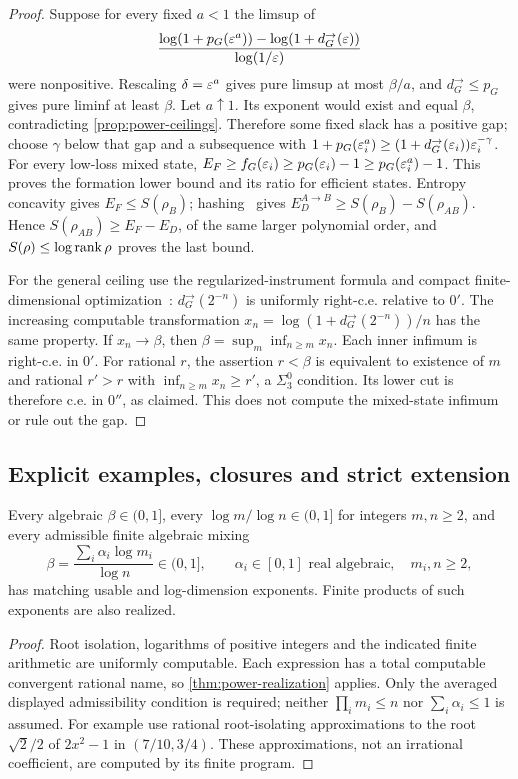 \begin{proof}
Suppose for every fixed $a<1$ the limsup of
\[
 \frac{\log(1+p_G(\varepsilon^a))-\log(1+d_G^\to(\varepsilon))}{\log(1/\varepsilon)}
\]
were nonpositive. Rescaling $\delta=\varepsilon^a$ gives pure limsup at most $\beta/a$, and $d_G^\to\le p_G$ gives pure liminf at least $\beta$. Let $a\uparrow1$. Its exponent would exist and equal $\beta$, contradicting \cref{prop:power-ceilings}. Therefore some fixed slack has a positive gap; choose $\gamma$ below that gap and a subsequence with
$1+p_G(\varepsilon_i^a)\ge(1+d_G^\to(\varepsilon_i))\varepsilon_i^{-\gamma}$.
For every low-loss mixed state, $E_F\ge f_G(\varepsilon_i)\ge p_G(\varepsilon_i)-1\ge p_G(\varepsilon_i^a)-1$. This proves the formation lower bound and its ratio for efficient states. Entropy concavity gives $E_F\le S(\rho_B)$; hashing~\cite{DW05} gives $E_D^{A\to B}\ge S(\rho_B)-S(\rho_{AB})$. Hence $S(\rho_{AB})\ge E_F-E_D$, of the same larger polynomial order, and $S(\rho)\le\log\operatorname{rank}\rho$ proves the last bound.

For the general ceiling use the regularized-instrument formula and compact finite-dimensional optimization~\cite[Theorem~11.14]{DM-precision}: $d_G^\to(2^{-n})$ is uniformly right-c.e. relative to $0'$. The increasing computable transformation $x_n=\log(1+d_G^\to(2^{-n}))/n$ has the same property. If $x_n\to\beta$, then $\beta=\sup_m\inf_{n\ge m}x_n$. Each inner infimum is right-c.e. in $0'$. For rational $r$, the assertion $r<\beta$ is equivalent to existence of $m$ and rational $r'>r$ with $\inf_{n\ge m}x_n\ge r'$, a $\Sigma^0_3$ condition. Its lower cut is therefore c.e. in $0''$, as claimed. This does not compute the mixed-state infimum or rule out the gap.
\end{proof}

\subsection{Explicit examples, closures and strict extension}
\begin{corollary}\label{cor:power-examples}
Every algebraic $\beta\in(0,1]$, every $\log m/\log n\in(0,1]$ for integers $m,n\ge2$, and every admissible finite algebraic mixing
\[
 \beta=\frac{\sum_i\alpha_i\log m_i}{\log n}\in(0,1],\qquad
 \alpha_i\in[0,1]\text{ real algebraic},\quad m_i,n\ge2,
\]
has matching usable and log-dimension exponents. Finite products of such exponents are also realized.
\end{corollary}
\begin{proof}
Root isolation, logarithms of positive integers and the indicated finite arithmetic are uniformly computable. Each expression has a total computable convergent rational name, so \cref{thm:power-realization} applies. Only the averaged displayed admissibility condition is required; neither $\prod_i m_i\le n$ nor $\sum_i\alpha_i\le1$ is assumed.
For example use rational root-isolating approximations to the root $\sqrt2/2$ of $2x^2-1$ in $(7/10,3/4)$. These approximations, not an irrational coefficient, are computed by its finite program.
\end{proof}

